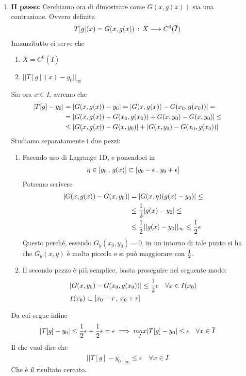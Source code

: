 \begin{enumerate}
	\item \textbf{II passo:} Cerchiamo ora di dimostrare come $G(x,g(x))$ sia una contrazione. Ovvero definita
	\begin{align}
		T[g](x) = G(x,g(x)) \, : \, X \longrightarrow C^0(\overline{I})
	\end{align}
	Innanzitutto ci serve che
	\begin{enumerate}
		\item $X= C^0(\overline{I})$
		\item $||T[g](x) - y_0||_\infty$
	\end{enumerate}
	Sia ora $x \in I$, avremo che
	\begin{align}
		|T[g] - y_0| {}&= |G(x,g(x)) - y_0| = |G(x,g(x)) - G(x_0,g(x_0))|= \nonumber \\
		&= |G(x,g(x)) - G(x_0,g(x_0))  + G(x,y_0) - G(x,y_0)|\leq \nonumber \\
		&\leq |G(x,g(x)) - G(x,y_0)| + |G(x,y_0) - G(x_0,g(x_0))|   
	\end{align}
	Studiamo separatamente i due pezzi:
	\begin{enumerate}
		\item Facendo uso di Lagrange 1D, e ponendoci in 
		\begin{align}
			\eta \in [y_0 \, , \, g(x)]\subset [y_0 - \epsilon \, , \, y_0 + \epsilon ]
		\end{align}
		Potremo scrivere
		\begin{align}
			|G(x,g(x)) - G(x,y_0)| {}&= |G(x,\eta) (g(x) - y_0)| \leq  \nonumber \\ 
			&\leq \frac{1}{2} |g(x) - y_0|  \leq \nonumber \\
			&\leq \frac{1}{2} ||g(x) - y_0||_\infty \leq \frac{1}{2} \epsilon
		\end{align}
		Questo perché, essendo $G_y(x_0,y_0)=0$, in un intorno di tale punto si ha che $G_y(x,y)$ è molto piccola e si può maggiorare con $\frac{1}{2}$.
		
		\item Il secondo pezzo è più semplice, basta proseguire nel seguente modo:
		\begin{align}
			{}&|G(x,y_0) - G(x_0,g(x_0))| \leq \frac{1}{2} \epsilon \quad \forall x \in I(x_0)\\ 
			&I(x_0)\subset [x_0 - r \, , \, x_0 + r]
		\end{align}
	\end{enumerate}
	Da cui segue infine 
	\begin{align}
		|T[g] - y_0| \leq \frac{1}{2} \epsilon + \frac{1}{2} \epsilon = \epsilon \implies \underset{I}{max}|T[g] - y_0| \leq \epsilon \quad \forall x \in \overline{I}
	\end{align}
	Il che vuol dire che
	\begin{align}
		||T[g] - y_0||_\infty \leq  \epsilon \quad \forall x \in \overline{I}
	\end{align}
	Che è il risultato cercato.
	

\end{enumerate}
